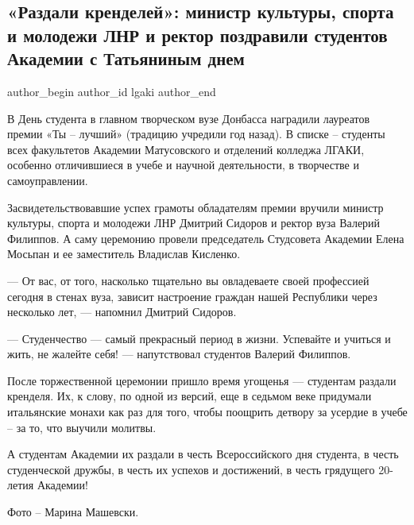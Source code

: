  
 
 
 
 
 
\subsection{«Раздали кренделей»: министр культуры, спорта и молодежи ЛНР и ректор поздравили студентов Академии с Татьяниным днем}
\label{sec:25_01_2022.stz.edu.lnr.lgaki.1.razdali_krendelej_tatjanin_den}
 
\ifcmt
 author_begin
   author_id lgaki
 author_end
\fi

В День студента в главном творческом вузе Донбасса наградили лауреатов премии
«Ты – лучший» (традицию учредили год назад). В списке – студенты всех
факультетов Академии Матусовского и отделений колледжа ЛГАКИ, особенно
отличившиеся в учебе и научной деятельности, в творчестве и самоуправлении.

Засвидетельствовавшие успех грамоты обладателям премии вручили министр
культуры, спорта и молодежи ЛНР Дмитрий Сидоров и ректор вуза Валерий Филиппов.
А саму церемонию провели председатель Студсовета Академии Елена Мосьпан и ее
заместитель Владислав Кисленко.

— От вас, от того, насколько тщательно вы овладеваете своей профессией сегодня
в стенах вуза, зависит настроение граждан нашей Республики через несколько лет,
— напомнил Дмитрий Сидоров.

— Студенчество — самый прекрасный период в жизни. Успевайте и учиться и жить,
не жалейте себя! — напутствовал студентов Валерий Филиппов.

После торжественной церемонии пришло время угощенья — студентам раздали
кренделя. Их, к слову, по одной из версий, еще в седьмом веке придумали
итальянские монахи как раз для того, чтобы поощрить детвору за усердие в учебе
– за то, что выучили молитвы.

А студентам Академии их раздали в честь Всероссийского дня студента, в честь
студенческой дружбы, в честь их успехов и достижений, в честь грядущего
20-летия Академии!

Фото – Марина Машевски.
